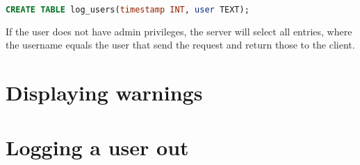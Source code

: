 \begin{lstlisting}[label = lst:log_users, language = SQL, numbers = none]
 CREATE TABLE log_users(timestamp INT, user TEXT);
\end{lstlisting}

If the user does not have admin privileges, the server will select all entries, where the username equals the user that send the request and return those to the client.





\section{Displaying warnings}
\label{sec:displaying_warnings}





\section{Logging a user out}
\label{sec:logging_a_user_out}



